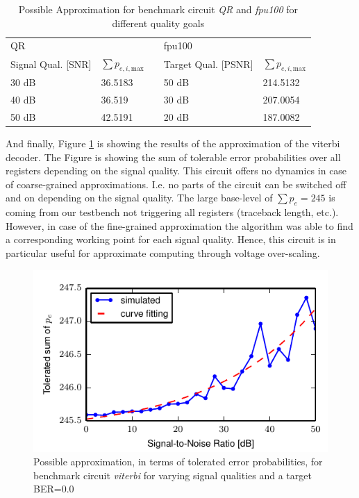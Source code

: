\documentclass[conference]{IEEEtran}
\begin{document}
\begin{table}[htb]
\caption{Possible Approximation for benchmark circuit \emph{QR} and \emph{fpu100} for different quality goals}
\label{tab:approx}
\centering
\begin{tabular} { l  l  l  l  l }
\multicolumn{2}{l}{QR} & & \multicolumn{2}{l}{fpu100} \\
\cline{1-2} \cline{4-5}
Signal Qual. [SNR] & $\sum p_{e,i,\textrm{max}}$ & & Target Qual. [PSNR] & $\sum p_{e,i,\textrm{max}}$\\
\cline{1-2} \cline{4-5}
30 dB & 36.5183 & &50 dB & 214.5132 \\
40 dB & 36.519 & &30 dB & 207.0054 \\
50 dB & 42.5191 & &20 dB & 187.0082 \\

\hline



\end{tabular}
\end{table}

And finally, Figure \ref{fig:power_viterbi} is showing the results of the approximation of the viterbi decoder. The Figure is showing the sum of tolerable error probabilities over all registers depending on the signal quality. This circuit offers no dynamics in case of coarse-grained approximations. I.e. no parts of the circuit can be switched off and on depending on the signal quality. The large base-level of $\sum p_e = 245$ is coming from our testbench not triggering all registers (traceback length, etc.). However, in case of the fine-grained approximation the algorithm was able to find a corresponding working point for each signal quality. Hence, this circuit is in particular useful for approximate computing through voltage over-scaling.
\begin{figure}[htb]
  \centering
  \includegraphics[width=.5\textwidth]{figs/optimization_viterbi}
  \caption{Possible approximation, in terms of tolerated error probabilities, for benchmark circuit \emph{viterbi} for varying signal qualities and a target BER=$0.0$}
  \label{fig:power_viterbi}
\end{figure}
\end{document}
